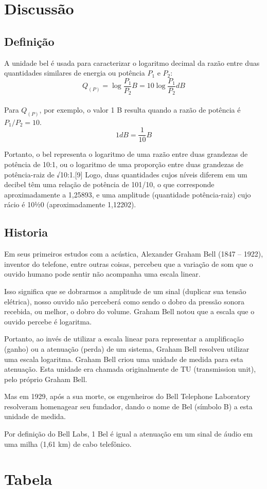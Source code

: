 \section{Discussão}

\subsection{Definição}
A unidade bel é usada para caracterizar o logaritmo decimal da razão entre duas quantidades similares de energia ou potência $P_1$ e $P_2$:\\
    $$Q_(P) = \log\frac{P_1}{P_2} B = 10 \log\frac{P_1}{P_2} dB$$\\
Para $Q_{(P)}$, por exemplo, o valor 1 B resulta quando a razão de potência é $P_1/P_2 = 10$.
$$1dB = \frac{1}{10} B$$

Portanto, o bel representa o logaritmo de uma razão entre duas grandezas de potência de 10:1, ou o logaritmo de uma proporção 
entre duas grandezas de potência-raiz de √10:1.[9] Logo, duas quantidades cujos níveis diferem em um decibel têm uma relação de potência de 101/10, 
o que corresponde aproximadamente a 1,25893, e uma amplitude (quantidade potência-raiz) cujo rácio é 101⁄20 (aproximadamente 1,12202).

\subsection{Historia}
Em seus primeiros estudos com a acústica, Alexander Graham Bell (1847 – 1922), 
inventor do telefone, entre outras coisas, percebeu que a variação de som que 
o ouvido humano pode sentir não acompanha uma escala linear.

Isso significa que se dobrarmos a amplitude de um sinal (duplicar sua tensão elétrica), 
nosso ouvido não perceberá como sendo o dobro da pressão sonora recebida, ou melhor, o dobro do volume.
Graham Bell notou que a escala que o ouvido percebe é logaritma.

Portanto, ao invés de utilizar a escala linear para representar a amplificação (ganho) ou a atenuação (perda) de um sistema, 
Graham Bell resolveu utilizar uma escala logaritma.
Graham Bell criou uma unidade de medida para esta atenuação. Esta unidade era chamada originalmente de TU (transmission unit), pelo próprio Graham Bell.

Mas em 1929, após a sua morte, os engenheiros do Bell Telephone Laboratory resolveram homenagear seu fundador, 
dando o nome de Bel (símbolo B) a esta unidade de medida.

Por definição do Bell Labs, 1 Bel é igual a atenuação em um sinal de áudio em uma milha (1,61 km) de cabo telefônico.

\section{Tabela}
